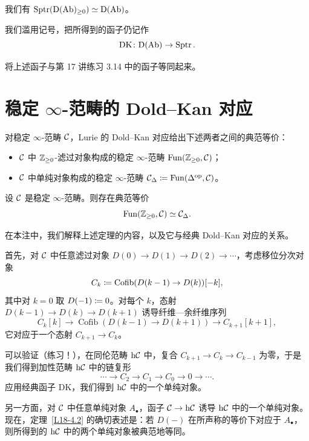 \begin{exercise}\label{L18-3.8}
我们有 $\operatorname{Sptr}(\mathrm{D}(\operatorname{Ab})_{\ge 0})\simeq\mathrm{D}(\operatorname{Ab})$。
\end{exercise}

\nitem\label{L18-3.9} 我们滥用记号，把所得到的函子仍记作
\[
\mathrm{DK}\colon\mathrm{D}(\operatorname{Ab})\to\operatorname{Sptr}.
\]

\begin{exercise}\label{L18-3.10}
将上述函子与第 17 讲练习 3.14 中的函子等同起来。
\end{exercise}

\section{稳定 $\infty$-范畴的 Dold–Kan 对应}

\nitem\label{L18-4.1} 对稳定 $\infty$-范畴 $\mathcal{C}$，Lurie 的 Dold–Kan 对应给出下述两者之间的典范等价：
\begin{itemize}[leftmargin=2.2em,itemsep=0.1em]
\item $\mathcal{C}$ 中 $\mathbb{Z}_{\ge 0}$-滤过对象构成的稳定 $\infty$-范畴 $\operatorname{Fun}(\mathbb{Z}_{\ge 0},\mathcal{C})$；
\item $\mathcal{C}$ 中单纯对象构成的稳定 $\infty$-范畴 $\mathcal{C}_{\Delta}\coloneqq\operatorname{Fun}(\Delta^{\mathrm{op}},\mathcal{C})$。
\end{itemize}

\begin{theorem}[HA.1.2.4.1]\label{L18-4.2}
设 $\mathcal{C}$ 是稳定 $\infty$-范畴。则存在典范等价
\[
\operatorname{Fun}(\mathbb{Z}_{\ge 0},\mathcal{C})\simeq\mathcal{C}_{\Delta}.
\]
\end{theorem}

\begin{remark}\label{L18-4.3}
在本注中，我们解释上述定理的内容，以及它与经典 Dold–Kan 对应的关系。

首先，对 $\mathcal{C}$ 中任意滤过对象 $D(0)\to D(1)\to D(2)\to\cdots$，考虑移位分次对象
\[
C_{k}\coloneqq\operatorname{Cofib}(D(k-1)\to D(k))[-k],
\]
其中对 $k=0$ 取 $D(-1)\coloneqq 0$。对每个 $k$，态射 $D(k-1)\to D(k)\to D(k+1)$ 诱导纤维—余纤维序列
\[
C_{k}[k]\to\operatorname{Cofib}(D(k-1)\to D(k+1))\to C_{k+1}[k+1],
\]
它对应于一个态射 $C_{k+1}\to C_{k}$。

可以验证（练习！），在同伦范畴 $\mathrm{h}\mathcal{C}$ 中，复合 $C_{k+1}\to C_{k}\to C_{k-1}$ 为零，于是我们得到加性范畴 $\mathrm{h}\mathcal{C}$ 中的链复形
\[
\cdots\to C_{2}\to C_{1}\to C_{0}\to 0\to\cdots.
\]
应用经典函子 $\mathrm{DK}$，我们得到 $\mathrm{h}\mathcal{C}$ 中的一个单纯对象。

另一方面，对 $\mathcal{C}$ 中任意单纯对象 $A_{\bullet}$，函子 $\mathcal{C}\to\mathrm{h}\mathcal{C}$ 诱导 $\mathrm{h}\mathcal{C}$ 中的一个单纯对象。现在，定理~\ref{L18-4.2} 的确切表述是：若 $D(-)$ 在所声称的等价下对应于 $A_{\bullet}$，则所得到的 $\mathrm{h}\mathcal{C}$ 中的两个单纯对象被典范地等同。
\end{remark}

